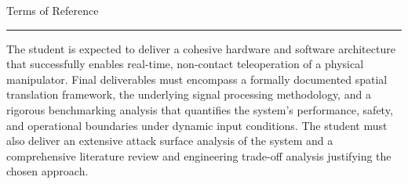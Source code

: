 \newpage
\thispagestyle{empty}
{\Large Terms of Reference}\\
\hrule


The student is expected to deliver a cohesive hardware and software architecture that successfully enables real-time, non-contact teleoperation of a physical manipulator. Final deliverables must encompass a formally documented spatial translation framework, the underlying signal processing methodology, and a rigorous benchmarking analysis that quantifies the system's performance, safety,
and operational boundaries under dynamic input conditions. The student must
also deliver an extensive attack surface analysis of the system and a comprehensive literature review and engineering trade-off analysis justifying the chosen approach.
